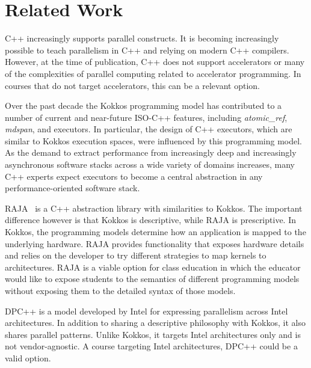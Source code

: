 \section{Related Work}\label{chap:related}


C++ increasingly supports parallel constructs. It is becoming increasingly possible to teach parallelism in C++ and relying on modern C++ compilers. However, at the time of publication, C++ does not support accelerators or many of the complexities of parallel computing related to accelerator programming. In courses that do not target accelerators, this can be a relevant option.

Over the past decade the Kokkos programming model has contributed to a number of current and near-future ISO-C++ features, including \emph{atomic\_ref}\cite{wg21_p0019}, \emph{mdspan}\cite{MDSPAN}, and executors.  In particular, the design of C++ executors, which are similar to Kokkos execution spaces, were influenced by this programming model. As the demand to extract performance from increasingly deep and increasingly asynchronous software stacks across a wide variety of domains increases, many C++ experts expect executors to become a central abstraction in any performance-oriented software stack. 

RAJA~\cite{RAJA} is a C++ abstraction library with similarities to Kokkos. The important difference however is that Kokkos is descriptive, while RAJA is prescriptive. In Kokkos, the programming models determine how an application is mapped to the underlying hardware. RAJA provides functionality that exposes hardware details and relies on the developer to try different strategies to map kernels to architectures. RAJA is a viable option for class education in which the educator would like to expose students to the semantics of different programming models without exposing them to the detailed syntax of those models.

DPC++\cite{DPCPP} is a model developed by Intel\textsuperscript{\textregistered} for expressing parallelism across Intel architectures. In addition to sharing a descriptive philosophy with Kokkos, it also shares parallel patterns. Unlike Kokkos, it targets Intel architectures only and is not vendor-agnostic. A course targeting Intel architectures, DPC++ could be a valid option.
 

